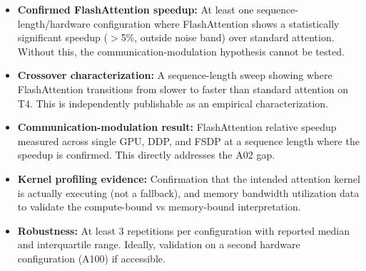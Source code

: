 \documentclass[12pt, a4paper]{article}
\begin{document}
\begin{itemize}
    \item \textbf{Confirmed FlashAttention speedup:} At least one sequence-length/hardware configuration where FlashAttention shows a statistically significant speedup ($>$5\%, outside noise band) over standard attention. Without this, the communication-modulation hypothesis cannot be tested.

    \item \textbf{Crossover characterization:} A sequence-length sweep showing where FlashAttention transitions from slower to faster than standard attention on T4. This is independently publishable as an empirical characterization.

    \item \textbf{Communication-modulation result:} FlashAttention relative speedup measured across single GPU, DDP, and FSDP at a sequence length where the speedup is confirmed. This directly addresses the A02 gap.

    \item \textbf{Kernel profiling evidence:} Confirmation that the intended attention kernel is actually executing (not a fallback), and memory bandwidth utilization data to validate the compute-bound vs memory-bound interpretation.

    \item \textbf{Robustness:} At least 3 repetitions per configuration with reported median and interquartile range. Ideally, validation on a second hardware configuration (A100) if accessible.
\end{itemize}
\end{document}
